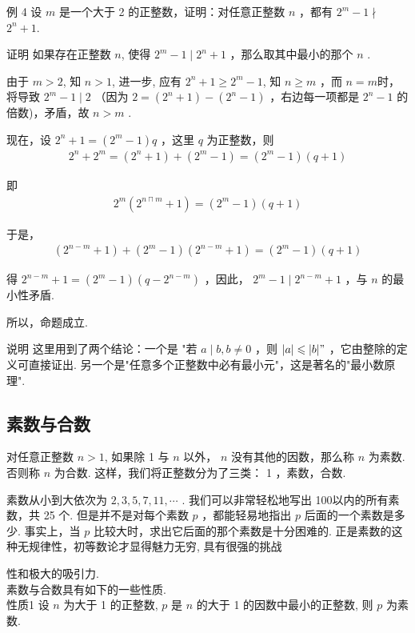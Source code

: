例 4 设 $m$ 是一个大于 2 的正整数，证明：对任意正整数 $n$ ，都有 $2^{m}-1 \nmid$ $2^{n}+1$.

证明 如果存在正整数 $n$, 使得 $2^{m}-1 \mid 2^{n}+1$ ，那么取其中最小的那个 $n$ . 

由于 $m>2$, 知 $n>1$, 进一步, 应有 $2^{n}+1 \geqslant 2^{m}-1$, 知 $n \geqslant m$ ，而 $n=m$时，将导致 $2^{m}-1 \mid 2$ （因为 $2=\left(2^{n}+1\right)-\left(2^{n}-1\right)$ ，右边每一项都是 $2^{n}-1$ 的倍数)，矛盾，故 $n>m$ . 

现在，设 $2^{n}+1=\left(2^{m}-1\right) q$ ，这里 $q$ 为正整数，则
\begin{align*}
2^{n}+2^{m}=\left(2^{n}+1\right)+\left(2^{m}-1\right)=\left(2^{m}-1\right)(q+1)
\end{align*}

即
\begin{align*}
2^{m}\left(2^{n \sqcap m}+1\right)=\left(2^{m}-1\right)(q+1)
\end{align*}

于是，
\begin{align*}
\left(2^{n-m}+1\right)+\left(2^{m}-1\right)\left(2^{n-m}+1\right)=\left(2^{m}-1\right)(q+1)
\end{align*}

得 $2^{n-m}+1=\left(2^{m}-1\right)\left(q-2^{n-m}\right)$ ，因此， $2^{m}-1 \mid 2^{n-m}+1$ ，与 $n$ 的最小性矛盾. 

所以，命题成立.

说明 这里用到了两个结论：一个是 "若 $a \mid b, b \neq 0$ ，则 $|a| \leqslant|b| "$ ，它由整除的定义可直接证出. 另一个是"任意多个正整数中必有最小元"，这是著名的"最小数原理". 

\subsection{素数与合数}
对任意正整数 $n>1$, 如果除 1 与 $n$ 以外， $n$ 没有其他的因数，那么称 $n$ 为素数. 否则称 $n$ 为合数. 这样，我们将正整数分为了三类： 1 ，素数，合数. 

素数从小到大依次为 $2,3,5,7,11, \cdots$ . 我们可以非常轻松地写出 100以内的所有素数，共 25 个. 但是并不是对每个素数 $p$ ，都能轻易地指出 $p$ 后面的一个素数是多少. 事实上，当 $p$ 比较大时，求出它后面的那个素数是十分困难的. 正是素数的这种无规律性，初等数论才显得魅力无穷, 具有很强的挑战

性和极大的吸引力. \\
素数与合数具有如下的一些性质. \\
性质1 设 $n$ 为大于 1 的正整数, $p$ 是 $n$ 的大于 1 的因数中最小的正整数, 则 $p$ 为素数.

